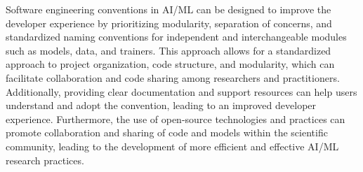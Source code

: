 Software engineering conventions in AI/ML can be designed to improve the developer experience by prioritizing modularity, separation of concerns, and standardized naming conventions for independent and interchangeable modules such as models, data, and trainers. This approach allows for a standardized approach to project organization, code structure, and modularity, which can facilitate collaboration and code sharing among researchers and practitioners. Additionally, providing clear documentation and support resources can help users understand and adopt the convention, leading to an improved developer experience. Furthermore, the use of open-source technologies and practices can promote collaboration and sharing of code and models within the scientific community, leading to the development of more efficient and effective AI/ML research practices.


